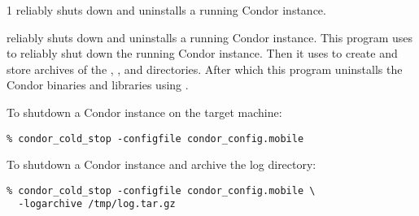 \begin{ManPage}{\label{man-condor-cold-stop}}{1}
{reliably shuts down and uninstalls a running Condor instance.}

\Synopsis {}


\Description 
{} reliably shuts down and uninstalls a
running Condor instance.   This program uses  to
reliably shut down the running Condor instance.  Then it uses
 to create and store archives of the
, , and  directories.  After which
this program uninstalls the Condor binaries and libraries using
.

\Examples

To shutdown a Condor instance on the target machine:

\begin{verbatim}
% condor_cold_stop -configfile condor_config.mobile
\end{verbatim}

To shutdown a Condor instance and archive the log directory:

\begin{verbatim}
% condor_cold_stop -configfile condor_config.mobile \
  -logarchive /tmp/log.tar.gz
\end{verbatim}


\end{ManPage}

